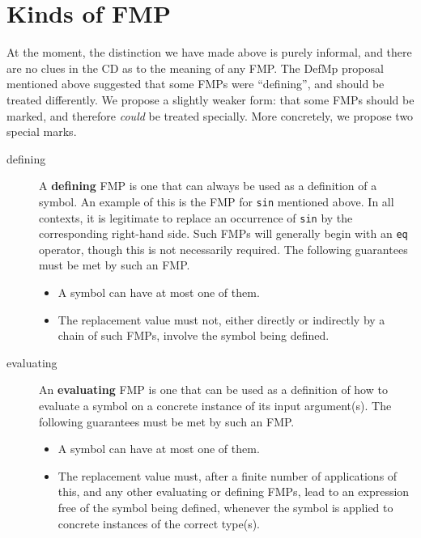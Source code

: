 \documentclass[11pt]{openmathTN}
\begin{document}
\section{Kinds of FMP}
At the moment, the distinction we have made above is purely informal, and
there are no clues in the CD as to the meaning of any FMP. The DefMp
proposal mentioned above suggested that some FMPs were ``defining'', and
should be treated differently. We propose a slightly weaker form: that some
FMPs should be marked, and therefore {\it could\/} be treated specially.
More concretely, we propose two special marks.
\begin{description}
\item[defining]A {\bf defining} FMP is one that can always be used as a
definition of a symbol. An example of this is the FMP for {\tt sin}
mentioned above. In all contexts, it is legitimate to replace an occurrence
of {\tt sin} by the corresponding right-hand side. Such FMPs will generally
begin with an {\tt eq} operator, though this is not necessarily required.
The following guarantees must be met by such an FMP.
\begin{itemize}
\item A symbol can have at most one of them.
\item The replacement value must not, either directly or indirectly by a
chain of such FMPs, involve the symbol being defined.
\end{itemize}
\item[evaluating]An {\bf evaluating} FMP is one that can be used as a
definition of how to evaluate a symbol on a concrete instance of its input
argument(s). The following guarantees must be met by such an FMP.
\begin{itemize}
\item A symbol can have at most one of them.
\item The replacement value must, after a finite number of applications of
this, and any other evaluating or defining FMPs, lead to an expression free
of the symbol being defined, whenever the symbol is applied to concrete
instances of the correct type(s).
\end{itemize}
\end{description}
\end{document}
